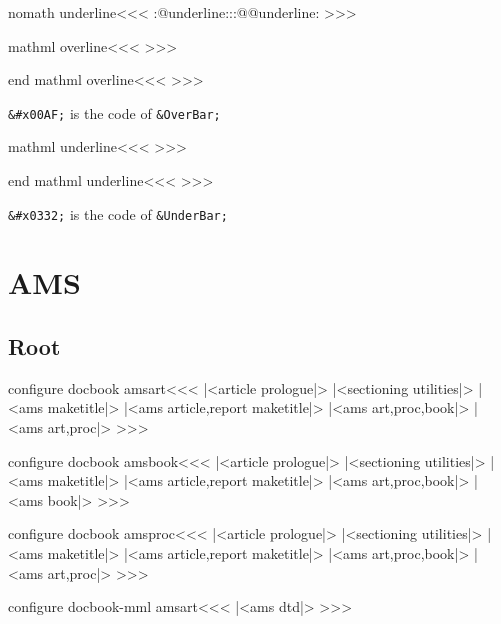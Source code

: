 \<nomath underline\><<<
\expandafter\everymath
\expandafter{\expandafter\everymath
             \expandafter{\the\everymath}}%
\let\o::@underline:\o:@@underline:
\def\o:@@underline:{\let\o:@@underline:\o::@underline:}%
>>>


\<mathml overline\><<<
%
>>>

\<end mathml overline\><<<
%
>>>

\verb'&#x00AF;' is the code of \verb'&OverBar;'


\<mathml underline\><<<
% 
>>>

\<end mathml underline\><<<
%
>>>


\verb'&#x0332;' is the code of \verb'&UnderBar;'



\chapter{AMS}


\section{Root}


\<configure docbook amsart\><<< 
|<article prologue|>
|<sectioning utilities|>
|<ams maketitle|>
|<ams article,report maketitle|>
|<ams art,proc,book|>
|<ams art,proc|>
>>>

\<configure docbook amsbook\><<< 
|<article prologue|>
|<sectioning utilities|>
|<ams maketitle|>
|<ams article,report maketitle|>
|<ams art,proc,book|>
|<ams book|>
>>>

\<configure docbook amsproc\><<< 
|<article prologue|>
|<sectioning utilities|>
|<ams maketitle|>
|<ams article,report maketitle|>
|<ams art,proc,book|>
|<ams art,proc|>
>>>

\<configure docbook-mml amsart\><<< 
|<ams dtd|>
>>>

